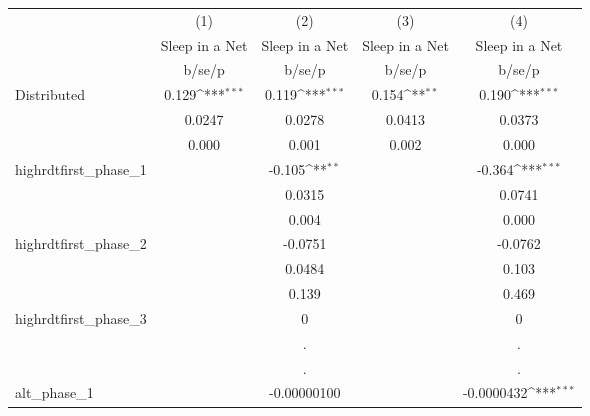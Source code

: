 {
\def\sym#1{\ifmmode^{#1}\else\(^{#1}\)\fi}
\begin{tabular}{l*{4}{c}}
\hline\hline
                    &\multicolumn{1}{c}{(1)}&\multicolumn{1}{c}{(2)}&\multicolumn{1}{c}{(3)}&\multicolumn{1}{c}{(4)}\\
                    &\multicolumn{1}{c}{Sleep in a Net}&\multicolumn{1}{c}{Sleep in a Net}&\multicolumn{1}{c}{Sleep in a Net}&\multicolumn{1}{c}{Sleep in a Net}\\
                    &      b/se/p         &      b/se/p         &      b/se/p         &      b/se/p         \\
\hline
Distributed         &       0.129\sym{***}&       0.119\sym{***}&       0.154\sym{**} &       0.190\sym{***}\\
                    &      0.0247         &      0.0278         &      0.0413         &      0.0373         \\
                    &       0.000         &       0.001         &       0.002         &       0.000         \\
highrdtfirst\_phase\_1&                     &      -0.105\sym{**} &                     &      -0.364\sym{***}\\
                    &                     &      0.0315         &                     &      0.0741         \\
                    &                     &       0.004         &                     &       0.000         \\
highrdtfirst\_phase\_2&                     &     -0.0751         &                     &     -0.0762         \\
                    &                     &      0.0484         &                     &       0.103         \\
                    &                     &       0.139         &                     &       0.469         \\
highrdtfirst\_phase\_3&                     &           0         &                     &           0         \\
                    &                     &           .         &                     &           .         \\
                    &                     &           .         &                     &           .         \\
alt\_phase\_1         &                     & -0.00000100         &                     &  -0.0000432\sym{***}\\

\end{tabular}}

